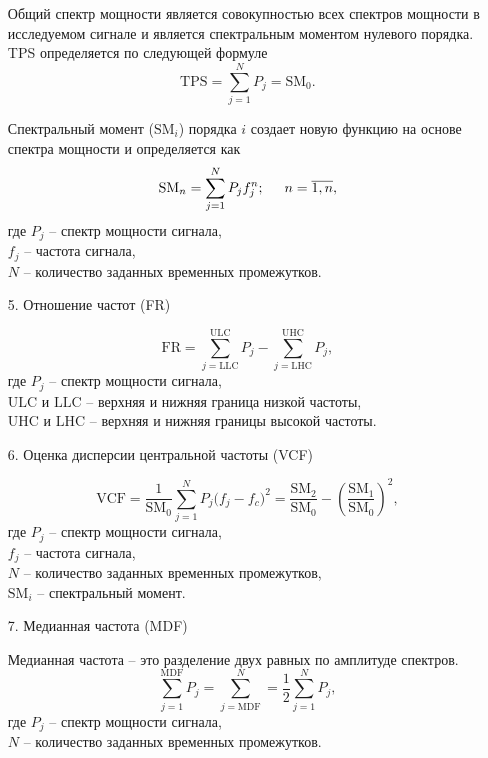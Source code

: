 \begin{itemize}[parsep=0.4em]
        Общий спектр мощности является совокупностью всех спектров мощности в исследуемом сигнале и является спектральным моментом нулевого порядка. TPS определяется по следующей формуле
        \begin{equation}
            \text{TPS} = \sum\limits_{j=1}^N P_j = \text{SM}_0.
        \end{equation}

        Спектральный момент ($\text{SM}_i$) порядка $i$ создает новую функцию на основе спектра мощности и определяется как
        \begin{equation}
            \text{SM}_n = \sum\limits_{j=1}^N P_j f_j^n;\hspace{0.5cm} n=\overline{1,n},
        \end{equation}
        где $P_j$ -- спектр мощности сигнала,\\ \phantom{где} $f_j$ -- частота сигнала,\\ \phantom{где} $N$ -- количество заданных временных промежутков.

    \item[5.] Отношение частот (FR)

        \begin{equation}
            \text{FR} = \sum\limits_{j=\text{LLC}}^\text{ULC} P_j - \sum\limits_{j=\text{LHC}}^\text{UHC} P_j,
        \end{equation}
        где $P_j$ -- спектр мощности сигнала,\\ \phantom{где} $\text{ULC}$ и $\text{LLC}$ -- верхняя и нижняя граница низкой частоты,\\ \phantom{где} $\text{UHC}$ и $\text{LHC}$ -- верхняя и нижняя границы высокой частоты.
    
    \newpage
    \item[6.] Оценка дисперсии центральной частоты (VCF)

        \begin{equation}
            \text{VCF} = \dfrac{1}{\text{SM}_0}\sum\limits_{j=1}^N P_j\bigl(f_j-f_c\bigr)^2 = \dfrac{\text{SM}_2}{\text{SM}_0} - \left(\dfrac{\text{SM}_1}{\text{SM}_0}\right)^2,
        \end{equation}
        где $P_j$ -- спектр мощности сигнала,\\ \phantom{где} $f_j$ -- частота сигнала,\\ \phantom{где} $N$ -- количество заданных временных промежутков,\\ \phantom{где} $\text{SM}_i$ -- спектральный момент.

    \item[7.] Медианная частота (MDF)

        Медианная частота -- это разделение двух равных по амплитуде спектров.
        \begin{equation}
            \sum\limits_{j=1}^\text{MDF}P_j=\sum\limits_{j=\text{MDF}}^N=\dfrac{1}{2}\sum\limits_{j=1}^N P_j,
        \end{equation}
        где $P_j$ -- спектр мощности сигнала,\\ \phantom{где} $N$ -- количество заданных временных промежутков.

\end{itemize}


